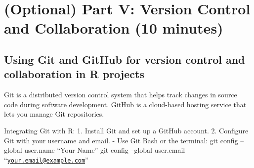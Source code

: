 \documentclass[
]{book}
\begin{document}
\chapter*{(Optional) Part V: Version Control and Collaboration (10 minutes)}\label{optional-part-v-version-control-and-collaboration-10-minutes}

\section*{Using Git and GitHub for version control and collaboration in R projects}\label{using-git-and-github-for-version-control-and-collaboration-in-r-projects}

Git is a distributed version control system that helps track changes in source code during software development. GitHub is a cloud-based hosting service that lets you manage Git repositories.

Integrating Git with R:
1. Install Git and set up a GitHub account.
2. Configure Git with your username and email.
- Use Git Bash or the terminal:
git config --global user.name ``Your Name''
git config --global user.email ``\href{mailto:your.email@example.com}{\nolinkurl{your.email@example.com}}''
\end{document}
